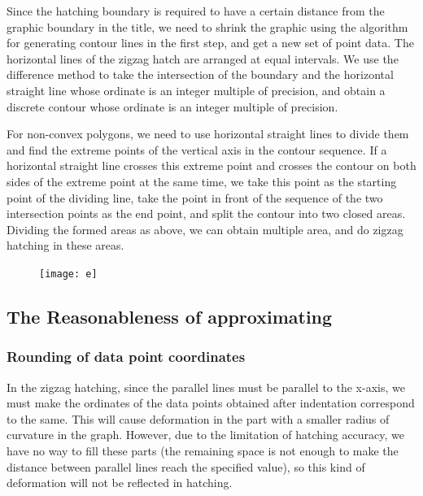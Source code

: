 \documentclass{apmcmthesis}
\begin{document}
Since the hatching boundary is required to have a certain distance from the graphic boundary in the title, we need to shrink the graphic using the algorithm for generating contour lines in the first step, and get a new set of point data. The horizontal lines of the zigzag hatch are arranged at equal intervals. We use the difference method to take the intersection of the boundary and the horizontal straight line whose ordinate is an integer multiple of precision, and obtain a discrete contour whose ordinate is an integer multiple of precision.


For non-convex polygons, we need to use horizontal straight lines to divide them and find the extreme points of the vertical axis in the contour sequence. If a horizontal straight line crosses this extreme point and crosses the contour on both sides of the extreme point at the same time, we take this point as the starting point of the dividing line, take the point in front of the sequence of the two intersection points as the end point, and split the contour into two closed areas. Dividing the formed areas as above, we can obtain multiple area, and do zigzag hatching in these areas.

\begin{figure}[!ht]
    \centering
    \texttt{[image: e]}
    \caption{}
\end{figure}


\subsection{The Reasonableness of approximating}


\subsubsection{Rounding of data point coordinates}
In the zigzag hatching, since the parallel lines must be parallel to the x-axis, we must make the ordinates of the data points obtained after indentation correspond to the same. This will cause deformation in the part with a smaller radius of curvature in the graph. However, due to the limitation of hatching accuracy, we have no way to fill these parts (the remaining space is not enough to make the distance between parallel lines reach the specified value), so this kind of deformation will not be reflected in hatching.
\end{document}
